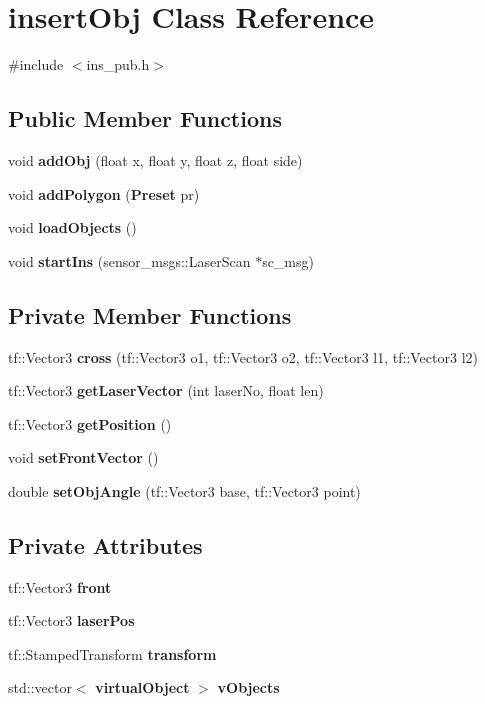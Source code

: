 \section{insertObj Class Reference}
\label{classinsertObj}


{\ttfamily \#include $<$ins\_\-pub.h$>$}

\subsection*{Public Member Functions}
\begin{DoxyCompactItemize}
\item 
void {\bf addObj} (float x, float y, float z, float side)
\item 
void {\bf addPolygon} ({\bf Preset} pr)
\item 
void {\bf loadObjects} ()
\item 
void {\bf startIns} (sensor\_\-msgs::LaserScan $\ast$sc\_\-msg)
\end{DoxyCompactItemize}
\subsection*{Private Member Functions}
\begin{DoxyCompactItemize}
\item 
tf::Vector3 {\bf cross} (tf::Vector3 o1, tf::Vector3 o2, tf::Vector3 l1, tf::Vector3 l2)
\item 
tf::Vector3 {\bf getLaserVector} (int laserNo, float len)
\item 
tf::Vector3 {\bf getPosition} ()
\item 
void {\bf setFrontVector} ()
\item 
double {\bf setObjAngle} (tf::Vector3 base, tf::Vector3 point)
\end{DoxyCompactItemize}
\subsection*{Private Attributes}
\begin{DoxyCompactItemize}
\item 
tf::Vector3 {\bf front}
\item 
tf::Vector3 {\bf laserPos}
\item 
tf::StampedTransform {\bf transform}
\item 
std::vector$<$ {\bf virtualObject} $>$ {\bf vObjects}
\end{DoxyCompactItemize}


